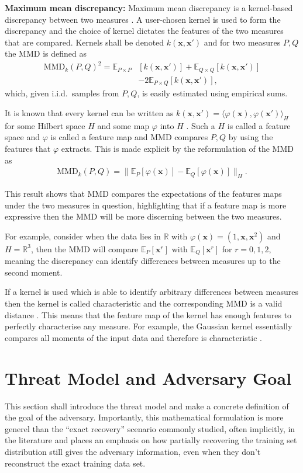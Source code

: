 \documentclass[hyperref]{article}
\theoremstyle{plain}
\theoremstyle{remark}
\newcommand{\bx}{\mathbf{x}}
\newcommand{\bbR}{\mathbb{R}}
\newcommand{\bbE}{\mathbb{E}}
\begin{document}
\textbf{Maximum mean discrepancy:} Maximum mean discrepancy is a kernel-based discrepancy between two measures \citep{gretton2012,muandet2017}. A user-chosen kernel is used to form the discrepancy and the choice of kernel dictates the features of the two measures that are compared. Kernels shall be denoted $k(\bx,\bx')$ and for two measures $P,Q$ the MMD is defined as 
\begin{align}
	\text{MMD}_{k}(P,Q)^{2} = \bbE_{P\times P}&[k(\bx,\bx')] + \bbE_{Q\times Q}[k(\bx,\bx')]\nonumber\\
	& - 2\bbE_{P\times Q}[k(\bx,\bx')] \label{eq:MMD_expansion},
\end{align}
which, given i.i.d.\ samples from $P,Q$, is easily estimated using empirical sums. 

It is known that every kernel can be written as $k(\bx,\bx') = \langle \varphi(\bx),\varphi(\bx')\rangle_{H}$ for some Hilbert space $H$ and some map $\varphi$ into $H$ \citep{Steinwart2008}. Such a $H$ is called a feature space and $\varphi$ is called a feature map and MMD compares $P,Q$ by using the features that $\varphi$ extracts. This is made explicit by the reformulation \citep[Lemma 4]{gretton2012} of the MMD as 
\begin{align}
	\text{MMD}_{k}(P,Q) = \lVert \bbE_{P}[\varphi(\bx)] - \bbE_{Q}[\varphi(\bx)] \rVert_{H}.\label{eq:MMD_hilbert}
\end{align}

This result shows that MMD compares the expectations of the features maps under the two measures in question, highlighting that if a feature map is more expressive then the MMD will be more discerning between the two measures. 

For example, consider when the data lies in $\bbR$ with $\varphi(\bx) = (1,\bx,\bx^{2})$ and $H = \bbR^{3}$, then the MMD will compare $\bbE_{P}[\bx^{r}]$ with $\bbE_{Q}[\bx^{r}]$ for $r = 0,1,2$, meaning the discrepancy can identify differences between measures up to the second moment. 

If a kernel is used which is able to identify arbitrary differences between measures then the kernel is called characteristic and the corresponding MMD is a valid distance \citep{Sriperumbudur2011}. This means that the feature map of the kernel has enough features to perfectly characterise any measure. For example, the Gaussian kernel essentially compares all moments of the input data and therefore is characteristic \citep{Steinwart2006}. 

\section{Threat Model and Adversary Goal}\label{sec:goals}
This section shall introduce the threat model and make a concrete definition of the goal of the adversary. Importantly, this mathematical formulation is more generel than the ``exact recovery'' scenario commonly studied, often implicitly,   in the literature and places an emphasis on how partially recovering the training set distribution still gives the adversary information, even when they don't reconstruct the exact training data set. 
\end{document}
